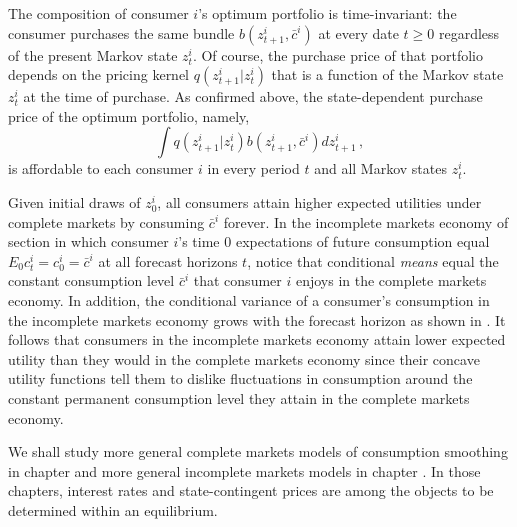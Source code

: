 The composition of 
consumer $i$'s optimum  portfolio is time-invariant: the consumer purchases the 
same bundle $b(z^i_{t+1}, \bar c^i)$
at every date $t\geq 0$ regardless
of the present Markov state $z^i_t$. Of course, the
purchase price of that portfolio depends on 
the pricing kernel $q(z^i_{t+1}|z^i_t)$ that 
is a function of the Markov state $z^i_t$ at
the time of purchase. As confirmed above,
the  state-dependent purchase price of the optimum 
portfolio, namely,  
$$
\int q(z^i_{t+1}|z^i_t) b(z^i_{t+1}, \bar c^i) d z^i_{t+1} \,,
$$
is affordable to each consumer $i$ in every 
period $t$ and all  Markov states  $z^i_t$.

Given  initial draws of $z^i_0$,
 all consumers   
attain  higher expected utilities  under complete 
markets by consuming $\bar c^i$ forever. 
In the incomplete markets economy of section  in which  
consumer $i$'s time $0$ expectations of 
future consumption  equal 
$E_0 c^i_t = c^i_0 = \bar c^i$ at all forecast
horizons $t$, notice that  conditional {\it means}  equal 
the constant consumption level $\bar c^i$ that
consumer $i$ enjoys  in the complete markets
economy. 
In addition, the conditional variance of 
a consumer's consumption in the incomplete markets
economy grows with the forecast horizon as shown in
. It follows that consumers in 
the incomplete markets economy attain lower expected 
utility than they would  in the  complete markets economy 
since their
concave utility functions tell them to   dislike 
fluctuations in consumption around the  constant permanent consumption level they attain 
in the complete markets economy.


We shall study  more general complete markets models of consumption smoothing in chapter 
and more general incomplete markets models in chapter
.  In those chapters, interest rates and state-contingent prices are  among
the objects to be  determined within an  equilibrium.




%
